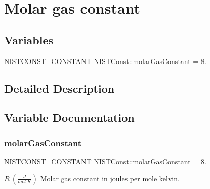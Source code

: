 \hypertarget{group___n_i_s_t_const-_molar_gas_constant}{}\section{Molar gas constant}
\label{group___n_i_s_t_const-_molar_gas_constant}
\subsection*{Variables}
\begin{DoxyCompactItemize}
\item 
N\+I\+S\+T\+C\+O\+N\+S\+T\+\_\+\+C\+O\+N\+S\+T\+A\+NT \mbox{\hyperlink{group___n_i_s_t_const-_molar_gas_constant_gac728faac7d754d8ddca4a4bd7565ec0e}{N\+I\+S\+T\+Const\+::molar\+Gas\+Constant}} = 8.
\end{DoxyCompactItemize}


\subsection{Detailed Description}


\subsection{Variable Documentation}
\mbox{\label{group___n_i_s_t_const-_molar_gas_constant_gac728faac7d754d8ddca4a4bd7565ec0e}} 
\subsubsection{\texorpdfstring{molar\+Gas\+Constant}{molarGasConstant}}
{\footnotesize\ttfamily N\+I\+S\+T\+C\+O\+N\+S\+T\+\_\+\+C\+O\+N\+S\+T\+A\+NT N\+I\+S\+T\+Const\+::molar\+Gas\+Constant = 8.}

$R \ (\frac{J}{mol\ K})$ Molar gas constant in joules per mole kelvin. 